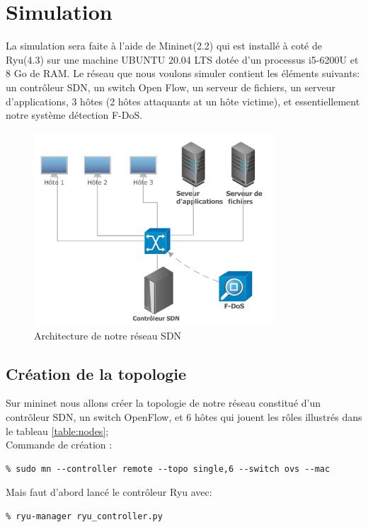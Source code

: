 \newpage
\section{Simulation}
La simulation sera faite à l'aide de Mininet(2.2) qui est installé à coté de Ryu(4.3) sur une machine UBUNTU 20.04 LTS dotée d'un processus i5-6200U et 8 Go de RAM. Le réseau que nous voulons simuler contient les éléments suivants: un contrôleur SDN, un switch Open Flow, un serveur de fichiers, un serveur d'applications, 3 hôtes (2 hôtes attaquants at un hôte victime), et essentiellement notre système détection F-DoS.
\begin{figure}[h]
\centering
\includegraphics[width=0.8\textwidth]{Figures/simulation}
\decoRule
\caption{Architecture de notre réseau SDN}
\label{fig:architecture}
\end{figure} 

\subsection{Création de la topologie}
Sur mininet nous allons créer la topologie de notre réseau constitué d'un contrôleur SDN, un switch OpenFlow, et 6 hôtes qui jouent les rôles illustrés dans le tableau \ref{table:nodes};\\

\noindent Commande de création :
\begin{verbatim}
% sudo mn --controller remote --topo single,6 --switch ovs --mac
\end{verbatim}
Mais faut d'abord lancé le contrôleur Ryu avec:
\begin{verbatim}
% ryu-manager ryu_controller.py 
\end{verbatim}

